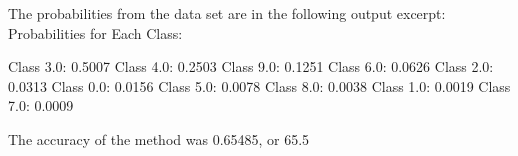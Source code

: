 The probabilities from the data set are in the following output excerpt:
Probabilities for Each Class:

Class 3.0: 0.5007
Class 4.0: 0.2503
Class 9.0: 0.1251
Class 6.0: 0.0626
Class 2.0: 0.0313
Class 0.0: 0.0156
Class 5.0: 0.0078
Class 8.0: 0.0038
Class 1.0: 0.0019
Class 7.0: 0.0009


The accuracy of the method was 0.65485, or 65.5%

